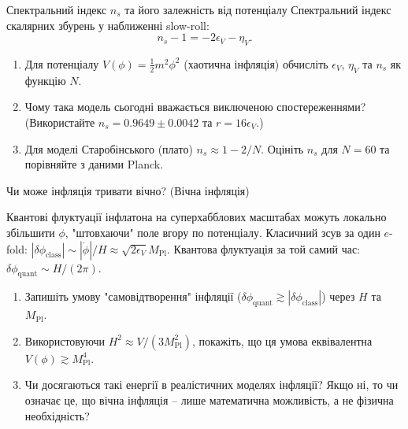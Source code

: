 \begin{problem}{Спектральний індекс $n_s$ та його залежність від потенціалу}
Спектральний індекс скалярних збурень у наближенні slow-roll:
\[
n_s - 1 = -2\epsilon_V - \eta_V.
\]

\begin{enumerate}
    \item Для потенціалу $V(\phi) = \frac{1}{2}m^2\phi^2$ (хаотична інфляція)
          обчисліть $\epsilon_V$, $\eta_V$ та $n_s$ як функцію $N$.
    \item Чому така модель сьогодні вважається виключеною спостереженнями?
          (Використайте $n_s = 0.9649 \pm 0.0042$ та $r = 16\epsilon_V$.)
    \item Для моделі Старобінського (плато) $n_s \approx 1 - 2/N$.
          Оцініть $n_s$ для $N = 60$ та порівняйте з даними Planck.
\end{enumerate}
\end{problem}


\begin{problem}{Чи може інфляція тривати вічно? (Вічна інфляція)}

Квантові флуктуації інфлатона на суперхабблових масштабах можуть
локально збільшити $\phi$, "штовхаючи" поле вгору по потенціалу.
Класичний зсув за один $e$-fold: $|\delta\phi_{\text{class}}| \sim |\dot{\phi}|/H \approx \sqrt{2\epsilon_V} M_{\mathrm{Pl}}$.
Квантова флуктуація за той самий час: $\delta\phi_{\text{quant}} \sim H/(2\pi)$.

\begin{enumerate}
    \item Запишіть умову "самовідтворення" інфляції ($\delta\phi_{\text{quant}} \gtrsim |\delta\phi_{\text{class}}|$)
          через $H$ та $M_{\mathrm{Pl}}$.
    \item Використовуючи $H^2 \approx V/(3M_{\mathrm{Pl}}^2)$, покажіть, що ця умова
          еквівалентна $V(\phi) \gtrsim M_{\mathrm{Pl}}^4$.
    \item Чи досягаються такі енергії в реалістичних моделях інфляції?
          Якщо ні, то чи означає це, що вічна інфляція -- лише математична
          можливість, а не фізична необхідність?
\end{enumerate}
\end{problem}